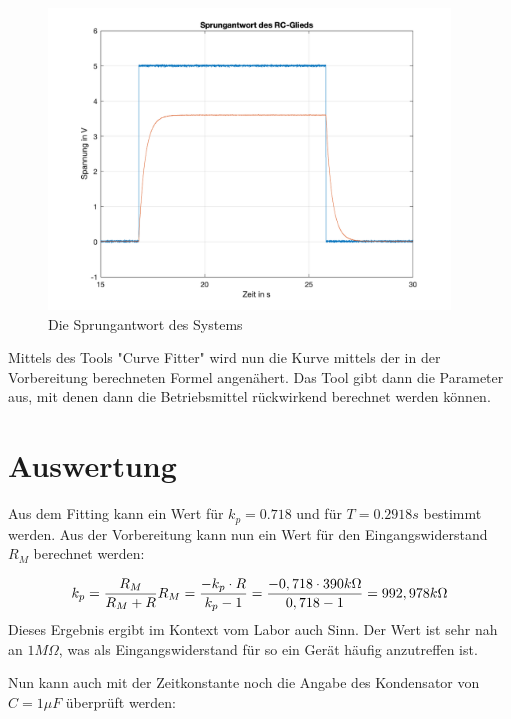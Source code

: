\documentclass{report}
\begin{document}
\begin{figure}[h]
  \begin{center}
    \includegraphics[width=0.95\textwidth]{assets/img/step_response.png}
  \end{center}
  \caption{Die Sprungantwort des Systems}
  \label{fig:step_resp}
\end{figure}

Mittels des Tools "Curve Fitter" wird nun die Kurve mittels der in der Vorbereitung berechneten Formel angenähert. Das Tool gibt dann die Parameter aus, mit denen dann die Betriebsmittel rückwirkend berechnet werden können.

\section{Auswertung}

Aus dem Fitting kann ein Wert für $k_p = 0.718$ und für $T = 0.2918s$ bestimmt werden. Aus der Vorbereitung kann nun ein Wert für den Eingangswiderstand $R_M$ berechnet werden:

\begin{equation}
  k_p = \frac{R_M}{R_M + R}\\
  R_M = \frac{-k_p\cdot R}{k_p-1} = \frac{-0,718 \cdot 390k\Omega}{0,718-1} = 992,978k\Omega
  \label{eq:rm}
\end{equation}
Dieses Ergebnis ergibt im Kontext vom Labor auch Sinn. Der Wert ist sehr nah an $1M\Omega$, was als Eingangswiderstand für so ein Gerät häufig anzutreffen ist.

Nun kann auch mit der Zeitkonstante noch die Angabe des Kondensator von $C = 1\mu F$ überprüft werden:
\end{document}
